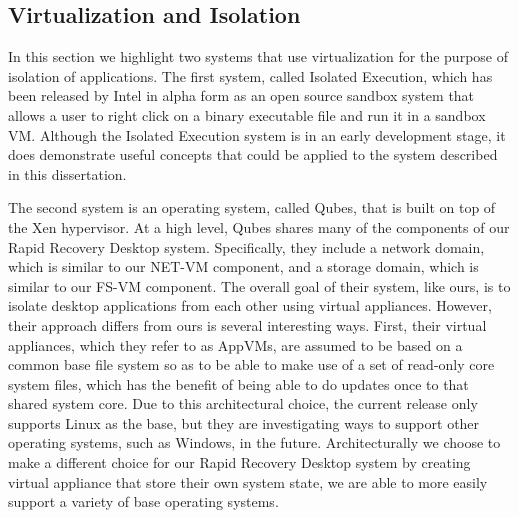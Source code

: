 \subsection{Virtualization and Isolation}

In this section we highlight two systems that use virtualization for the purpose of isolation of applications. The first system, called Isolated Execution\cite{isolated_execution_2010}, which has been released by Intel in alpha form as an open source sandbox system that allows a user to right click on a binary executable file and run it in a sandbox VM. Although the Isolated Execution system is in an early development stage, it does demonstrate useful concepts that could be applied to the system described in this dissertation.

The second system is an operating system, called Qubes\cite{qubes-os_2010}, that is built on top of the Xen hypervisor. At a high level, Qubes shares many of the components of our Rapid Recovery Desktop system. Specifically, they include a network domain, which is similar to our NET-VM component, and a storage domain, which is similar to our FS-VM component. The overall goal of their system, like ours, is to isolate desktop applications from each other using virtual appliances. However, their approach differs from ours is several interesting ways. First, their virtual appliances, which they refer to as AppVMs, are assumed to be based on a common base file system so as to be able to make use of a set of read-only core system files, which has the benefit of being able to do updates once to that shared system core. Due to this architectural choice, the current release only supports Linux as the base, but they are investigating ways to support other operating systems, such as Windows, in the future. Architecturally we choose to make a different choice for our Rapid Recovery Desktop system by creating virtual appliance that store their own system state, we are able to more easily support a variety of base operating systems.

